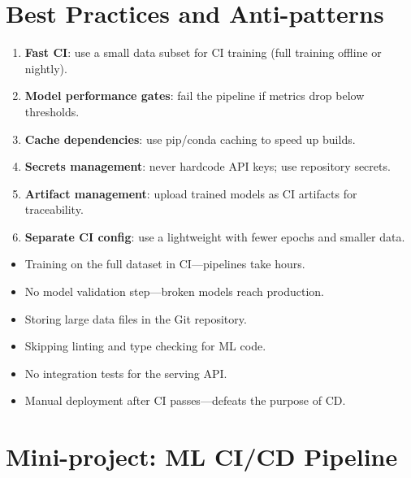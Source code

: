 \section{Best Practices and Anti-patterns}

\begin{bestpractice}[title=\textbf{CI/CD best practices for ML}]
\begin{enumerate}
  \item \textbf{Fast CI}: use a small data subset for CI training
    (full training offline or nightly).
  \item \textbf{Model performance gates}: fail the pipeline if
    metrics drop below thresholds.
  \item \textbf{Cache dependencies}: use pip/conda caching to speed
    up builds.
  \item \textbf{Secrets management}: never hardcode API keys; use
    repository secrets.
  \item \textbf{Artifact management}: upload trained models as CI
    artifacts for traceability.
  \item \textbf{Separate CI config}: use a lightweight
     with fewer epochs and smaller data.
\end{enumerate}
\end{bestpractice}

\begin{antipattern}[title=\textbf{CI/CD anti-patterns}]
\begin{itemize}
  \item Training on the full dataset in CI---pipelines take hours.
  \item No model validation step---broken models reach production.
  \item Storing large data files in the Git repository.
  \item Skipping linting and type checking for ML code.
  \item No integration tests for the serving API.
  \item Manual deployment after CI passes---defeats the purpose of CD.
\end{itemize}
\end{antipattern}

\section{Mini-project: ML CI/CD Pipeline}
\label{sec:mini-project-ch9}

